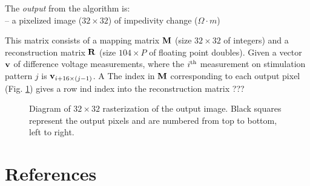 \documentclass[letterpaper,twocolumn,11pt]{article}
\newcommand{\vB}{\mbox{$\bf v$}}
\newcommand{\RB}{\mbox{$\bf R$}}
\newcommand{\MB}{\mbox{$\bf M$}}
\begin{document}
The {\em output} from the algorithm is:
\\
   -- a pixelized image ($32\times 32$) of 
      impedivity change ($\Omega \cdot m$)


      This matrix consists of a mapping matrix $\MB$ (size $32\times 32$ of
      integers) and a reconstruction matrix $\RB$ (size $104\times P$ of
      floating point doubles).
      Given a vector $\vB$ of difference voltage measurements, where
      the $i^{\rm th}$ measurement on stimulation pattern $j$ is
      $\vB_{i+16\times(j-1)}$. A 
      The index in $\MB$ corresponding to each output pixel
      (Fig. \ref{fig:reconst_detail}) gives a row ind index into the
      reconstruction matrix 
???

\begin{figure}[bhtp]
\begin{center}

\caption{ \label{fig:reconst_detail}
Diagram of $32\times 32$ rasterization of the output image. Black
squares represent the output pixels and are numbered from top
to bottom, left to right.
}
\end{center}
\end{figure}



\section*{References}
\end{document}
